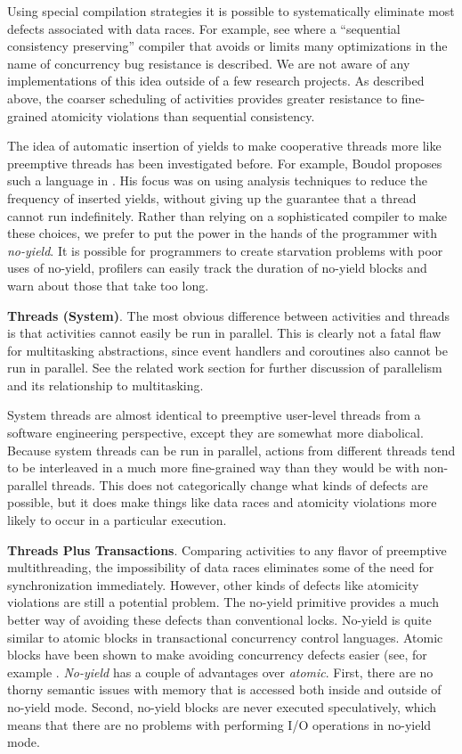 \documentclass[9pt,preprint]{sigplanconf-2}
\begin{document}
Using special compilation strategies it is possible to systematically eliminate most defects associated with data races.
For example, see \cite{Singh2012} where a ``sequential consistency preserving'' compiler that avoids or limits many optimizations in the name of concurrency bug resistance is described.
We are not aware of any implementations of this idea outside of a few research projects.
As described above, the coarser scheduling of activities provides greater resistance to fine-grained atomicity violations than sequential consistency.

The idea of automatic insertion of yields to make cooperative threads more like preemptive threads has been investigated before.
For example, Boudol proposes such a language in \cite{Boudol2007}.
His focus was on using analysis techniques to reduce the frequency of inserted yields, without giving up the guarantee that a thread cannot run indefinitely.
Rather than relying on a sophisticated compiler to make these choices, we prefer to put the power in the hands of the programmer with \emph{no-yield}.
It is possible for programmers to create starvation problems with poor uses of no-yield, profilers can easily track the duration of no-yield blocks and warn about those that take too long.

\textbf{Threads (System)}.
The most obvious difference between activities and threads is that activities cannot easily be run in parallel.
This is clearly not a fatal flaw for multitasking abstractions, since event handlers and coroutines also cannot be run in parallel.
See the related work section for further discussion of parallelism and its relationship to multitasking.

System threads are almost identical to preemptive user-level threads from a software engineering perspective, except they are somewhat more diabolical.
Because system threads can be run in parallel, actions from different threads tend to be interleaved in a much more fine-grained way than they would be with non-parallel threads.
This does not categorically change what kinds of defects are possible, but it does make things like data races and atomicity violations more likely to occur in a particular execution.

\textbf{Threads Plus Transactions}.
Comparing activities to any flavor of preemptive multithreading, the impossibility of data races eliminates some of the need for synchronization immediately.
However, other kinds of defects like atomicity violations are still a potential problem.
The no-yield primitive provides a much better way of avoiding these defects than conventional locks.
No-yield is quite similar to atomic blocks in transactional concurrency control languages.
Atomic blocks have been shown to make avoiding concurrency defects easier (see, for example \cite{Harris2005, Grossman2007}.
\emph{No-yield} has a couple of advantages over \emph{atomic}.
First, there are no thorny semantic issues with memory that is accessed both inside and outside of no-yield mode.
Second, no-yield blocks are never executed speculatively, which means that there are no problems with performing I/O operations in no-yield mode.
\end{document}
